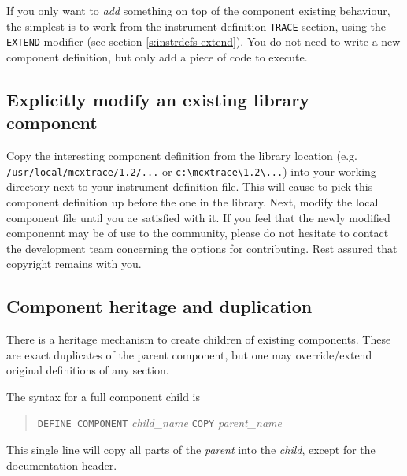 If you only want to \emph{add} something on top of the component existing
behaviour, the simplest is to work from the instrument definition
\texttt{TRACE} section, using the \texttt{EXTEND} modifier (see section
\ref{s:instrdefs-extend}). You do not need to write a new component
definition, but only add a piece of code to execute.

\subsection{Explicitly modify an existing library component}
Copy the interesting component definition from the \MCX library location (e.g. \verb+/usr/local/mcxtrace/1.2/...+ or \verb+c:\mcxtrace\1.2\...+) into your working directory next to
your instrument definition file. 
This will cause \MCX to pick this component definition up before the one in the library.
Next, modify the local component file until you ae satisfied with it. If you feel that the newly modified componennt may be of use to the \MCX community, please do not hesitate to contact the
development team concerning the options for contributing. Rest assured that copyright remains with you. 

\subsection{Component heritage and duplication}

There is a heritage mechanism to create children of existing components. These are exact duplicates of the parent component, but one may override/extend original definitions of any section.

The syntax for a full component child is
\begin{quote}
  \texttt{DEFINE COMPONENT} \textit{child\_name} \texttt{COPY} \textit{parent\_name}
\end{quote}
This single line will copy all parts of the \textit{parent} into the \textit{child}, except for the documentation header.

